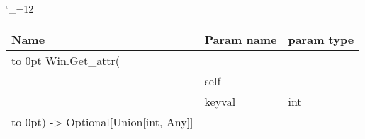 \begingroup \catcode`\_=12 \tt
\begin{tabular}{lll}
\toprule
\textrm{Name}&\textrm{Param name}&\textrm{param type}\\
\midrule
\hbox to 0pt {Win.Get_attr(\hss}\\
& self\\
& keyval & int\\
\hbox to 0pt{) -> Optional[Union[int, Any]]\hss}\\
\bottomrule
\end{tabular}
\endgroup
